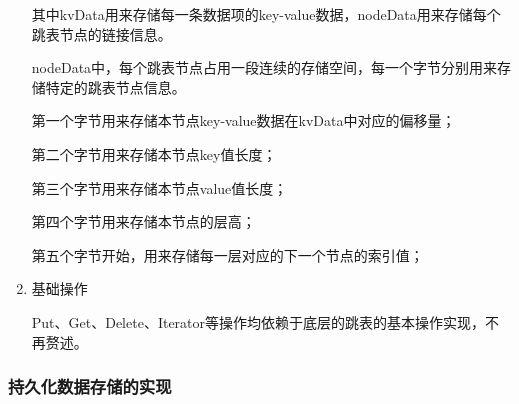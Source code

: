 \begin{enumerate}
			
			其中kvData用来存储每一条数据项的key-value数据，nodeData用来存储每个跳表节点的链接信息。

			nodeData中，每个跳表节点占用一段连续的存储空间，每一个字节分别用来存储特定的跳表节点信息。

			第一个字节用来存储本节点key-value数据在kvData中对应的偏移量；
			
			第二个字节用来存储本节点key值长度；
			
			第三个字节用来存储本节点value值长度；
			
			第四个字节用来存储本节点的层高；
			
			第五个字节开始，用来存储每一层对应的下一个节点的索引值；

		\item 基础操作
		
		Put、Get、Delete、Iterator等操作均依赖于底层的跳表的基本操作实现，不再赘述。
		\end{enumerate}

		\subsubsection{持久化数据存储的实现}


